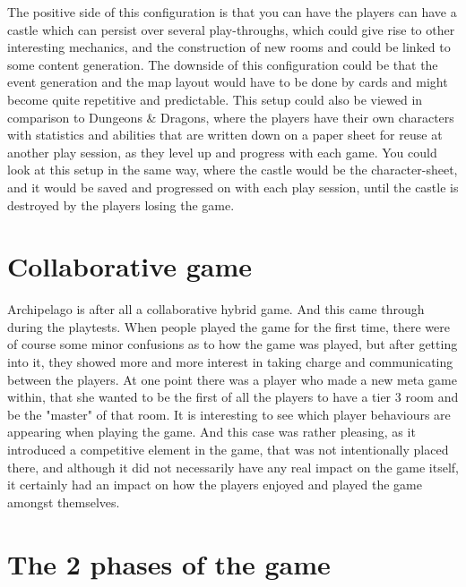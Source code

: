 The positive side of this configuration is that you can have the players can have a castle which can persist over several play-throughs, which could give rise to other interesting mechanics, and the construction of new rooms and could be linked to some content generation. 
The downside of this configuration could be that the event generation and the map layout would have to be done by cards and might become quite repetitive and predictable. This setup could also be viewed in comparison to Dungeons \& Dragons\cite{game:dnd}, where the players have their own characters with statistics and abilities that are written down on a paper sheet for reuse at another play session, as they level up and progress with each game. You could look at this setup in the same way, where the castle would be the character-sheet, and it would be saved and progressed on with each play session, until the castle is destroyed by the players losing the game.

\section{Collaborative game} 
Archipelago is after all a collaborative hybrid game. And this came through during the playtests. When people played the game for the first time, there were of course some minor confusions as to how the game was played, but after getting into it, they showed more and more interest in taking charge and communicating between the players. At one point there was a player who made a new meta game within, that she wanted to be the first of all the players to have a tier 3 room and be the "master" of that room. It is interesting to see which player behaviours are appearing when playing the game. And this case was rather pleasing, as it introduced a competitive element in the game, that was not intentionally placed there, and although it did not necessarily have any real impact on the game itself, it certainly had an impact on how the players enjoyed and played the game amongst themselves.
\section{The 2 phases of the game}

